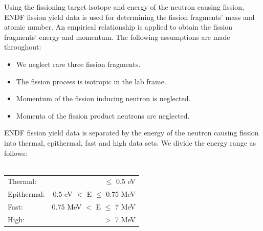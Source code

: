 \documentclass{anstrans}
\begin{document}
Using the fissioning target isotope and energy of the neutron causing fission, ENDF fission yield data \cite{ENDFManual} is used for determining the fission fragments' mass and atomic number. An empirical relationship is applied to obtain the fission fragments' energy and momentum. 
The following assumptions are made throughout:
\begin{itemize}
  \item We neglect rare three fission fragments.
  \item The fission process is isotropic in the lab frame.
  \item Momentum of the fission inducing neutron is neglected.
  \item Momenta of the fission product neutrons are neglected.
\end{itemize}

ENDF fission yield data is separated by the energy of the neutron causing fission into thermal, epithermal, fast and high data sets. We divide the energy range as follows:\\\\
\begin{tabular}{  l  r }
  Thermal:    & $\le$ 0.5 eV \\
  Epithermal: & 0.5 eV $<$ E $\le$ 0.75 MeV \\
  Fast:       & 0.75 MeV $<$ E $\le$ 7 MeV \\
  High:       & $>$ 7 MeV \\
\end{tabular}\\\\
\end{document}
